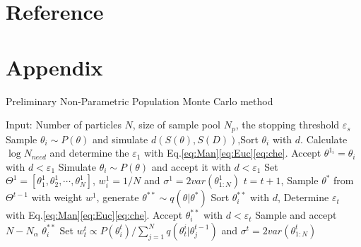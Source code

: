 \documentclass[review]{elsarticle}
\begin{document}
\section*{Reference}




\section*{Appendix}

\begin{algorithm}
\caption{Preliminary Non-Parametric Population Monte Carlo method}
\label{al:1}
\begin{algorithmic}[1]
\STATE Input: Number of particles $N$, size of sample pool $N_p$, the stopping threshold $\varepsilon_s$
    \STATE Sample $\theta_i \sim P(\theta)$ and simulate $d(S(\theta),S(D))$,Sort $\theta_i$ with $d$.
    \STATE Calculate $\log{N_{need}}$ and determine the $\varepsilon_1$ with Eq.\ref{eq:Man}\ref{eq:Euc}\ref{eq:che}.
    \STATE Accept $\theta^{1_i} = \theta_i$ with $d < \varepsilon_1$
\ENDFOR
{}
    \STATE Simulate $\theta_i \sim P(\theta)$ and accept it with $d<\varepsilon_1$
\ENDFOR
\STATE Set $\Theta^{1} = [\theta^1_1,\theta^1_2,\cdots, \theta^1_N]$, $w^1_i = 1/N$ and $\sigma^1 = 2 var(\theta^1_{1:N})$
    \STATE $t=t+1$, Sample $\theta^*$ from $\Theta^{t-1}$ with weight $w^1$, generate $\theta^{**} \sim q(\theta|\theta^*)$
    \STATE Sort $\theta^{**}_i$ with $d$, Determine $\varepsilon_t$ with Eq.\ref{eq:Man}\ref{eq:Euc}\ref{eq:che}.
    \STATE Accept $\theta^{**}_i$ with $d < \varepsilon_t$
    \STATE Sample and accept $N-N_\alpha$ $\theta^{**}_i$
    \STATE Set $w_t^t\propto P(\theta^{t}_i)/\sum_{j=1}^{N}q(\theta_t^i|\theta_j^{t-1})$ and $\sigma^t = 2 var(\theta^{t}_{1:N})$
\ENDWHILE
\end{algorithmic}
\end{algorithm}
\end{document}
